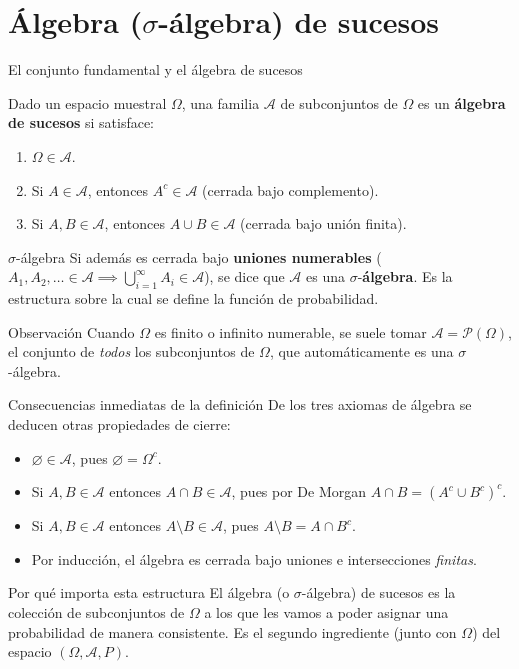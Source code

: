 \documentclass[aspectratio=169,11pt]{beamer}
\begin{document}
\section{Álgebra ($\sigma$-álgebra) de sucesos}

\begin{frame}{El conjunto fundamental y el álgebra de sucesos}
\begin{definition}
Dado un espacio muestral $\Omega$, una familia $\mathcal{A}$ de subconjuntos de $\Omega$ es un \textbf{álgebra de sucesos} si satisface:
\begin{enumerate}
\item $\Omega \in \mathcal{A}$.
\item Si $A \in \mathcal{A}$, entonces $A^c \in \mathcal{A}$ (cerrada bajo complemento).
\item Si $A, B \in \mathcal{A}$, entonces $A \cup B \in \mathcal{A}$ (cerrada bajo unión finita).
\end{enumerate}
\end{definition}

\begin{block}{$\sigma$-álgebra}
Si además es cerrada bajo \textbf{uniones numerables} ($A_1, A_2, \dots \in \mathcal{A} \implies \bigcup_{i=1}^{\infty} A_i \in \mathcal{A}$), se dice que $\mathcal{A}$ es una $\sigma$-\textbf{álgebra}. Es la estructura sobre la cual se define la función de probabilidad.
\end{block}

\begin{alertblock}{Observación}
Cuando $\Omega$ es finito o infinito numerable, se suele tomar $\mathcal{A} = \mathcal{P}(\Omega)$, el conjunto de \emph{todos} los subconjuntos de $\Omega$, que automáticamente es una $\sigma$-álgebra.
\end{alertblock}
\end{frame}

\begin{frame}{Consecuencias inmediatas de la definición}
De los tres axiomas de álgebra se deducen otras propiedades de cierre:
\begin{itemize}
\item $\varnothing \in \mathcal{A}$, pues $\varnothing = \Omega^c$.
\item Si $A,B\in\mathcal{A}$ entonces $A\cap B \in \mathcal{A}$, pues por De Morgan $A \cap B = (A^c \cup B^c)^c$.
\item Si $A,B \in \mathcal{A}$ entonces $A\setminus B \in \mathcal{A}$, pues $A\setminus B = A \cap B^c$.
\item Por inducción, el álgebra es cerrada bajo uniones e intersecciones \emph{finitas}.
\end{itemize}

\vspace{0.3em}
\begin{block}{Por qué importa esta estructura}
El álgebra (o $\sigma$-álgebra) de sucesos es la colección de subconjuntos de $\Omega$ a los que les vamos a poder asignar una probabilidad de manera consistente. Es el segundo ingrediente (junto con $\Omega$) del espacio $(\Omega, \mathcal{A}, P)$.
\end{block}
\end{frame}
\end{document}
